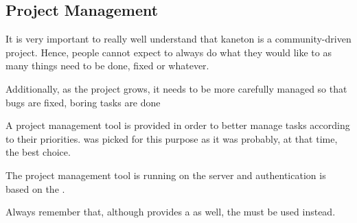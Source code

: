 %
%
%
%
%
%

%
%

\subsection{Project Management}
\label{section:project management}

It is very important to really well understand that kaneton is a
community-driven project. Hence, people cannot expect to always do what
they would like to as many things need to be done, fixed or whatever.

Additionally, as the project grows, it needs to be more carefully managed
so that bugs are fixed, boring tasks are done \etc{}

A project management tool is provided in order to better manage tasks
according to their priorities.  was picked for this purpose
as it was probably, at that time, the best choice.

The project management tool is running on the 
server and authentication is based on the .

Always remember that, although  provides a  as well,
the   must be used
instead.

